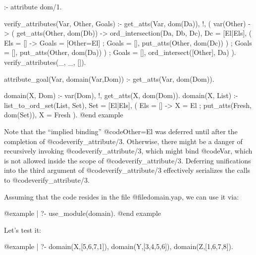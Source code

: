 {{{{{{{{{:- attribute dom/1.

verify_attributes(Var, Other, Goals) :-
        get_atts(Var, dom(Da)), !,          %
        (   var(Other) ->                   %
            (   get_atts(Other, dom(Db)) -> %
                ord_intersection(Da, Db, Dc),
                Dc = [El|Els],              %
                (   Els = [] ->             %
                    Goals = [Other=El]      %
                ;   Goals = [],
                    put_atts(Other, dom(Dc))%
                )
            ;   Goals = [],
                put_atts(Other, dom(Da))    %
            )
        ;   Goals = [],
            ord_intersect([Other], Da)      %
        ).
verify_attributes(_, _, []).                %

attribute_goal(Var, domain(Var,Dom)) :-     %
        get_atts(Var, dom(Dom)).

domain(X, Dom) :-
        var(Dom), !,
        get_atts(X, dom(Dom)).
domain(X, List) :-
        list_to_ord_set(List, Set),
        Set = [El|Els],                     %
        (   Els = [] ->                     %
            X = El                          %
        ;   put_atts(Fresh, dom(Set)),
            X = Fresh                       %
        ).
@end example

Note that the ``implied binding'' @code{Other=El} was deferred until after
the completion of @code{verify_attribute/3}.  Otherwise, there might be a
danger of recursively invoking @code{verify_attribute/3}, which might bind
@code{Var}, which is not allowed inside the scope of @code{verify_attribute/3}.
Deferring unifications into the third argument of @code{verify_attribute/3}
effectively serializes the calls to @code{verify_attribute/3}.

Assuming that the code resides in the file @file{domain.yap}, we
can use it via:

@example
| ?- use_module(domain).
@end example

Let's test it:

@example
| ?- domain(X,[5,6,7,1]), domain(Y,[3,4,5,6]), domain(Z,[1,6,7,8]).

}}}}}}}}}
